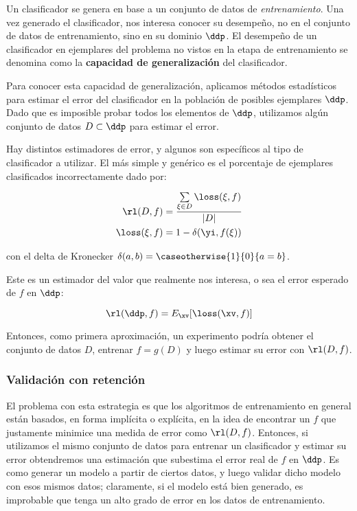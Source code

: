 
Un clasificador se genera en base a un conjunto de datos de \textit{entrenamiento}. Una vez generado el clasificador, nos interesa conocer su desempeño, no en el conjunto de datos de entrenamiento, sino en su dominio $\ddp$. El desempeño de un clasificador en ejemplares del problema no vistos en la etapa de entrenamiento se denomina como la \textbf{capacidad de generalización} del clasificador. 

Para conocer esta capacidad de generalización, aplicamos métodos estadísticos para estimar el error del clasificador en la población de posibles ejemplares $\ddp$. Dado que es imposible probar todos los elementos de $\ddp$, utilizamos algún conjunto de datos $D \subset \ddp$ para estimar el error.

Hay distintos estimadores de error, y algunos son específicos al tipo de clasificador a utilizar. El más simple y genérico es el porcentaje de ejemplares clasificados incorrectamente dado por:

\begin{align}
\rl(D,f) &= \frac{\sum\limits_{\xi \in D} \loss(\xi,f) }{|D|} \\
\loss(\xi	,f) &= 1-\delta(\yi,f(\xi))
\end{align}

con el delta de Kronecker $\delta(a,b)= \caseotherwise{1}{0}{a=b}$. 

Este es un estimador del valor que realmente nos interesa, o sea el error esperado de $f$ en $\ddp$:

\begin{equation}
  \rl(\ddp,f)= E_{\xv} [ \loss(\xv,f) ]
\end{equation}

Entonces, como primera aproximación, un experimento podría obtener el conjunto de datos $D$, entrenar $f=g(D)$ y luego estimar su error con $\rl(D,f)$. 

\subsubsection{Validación con retención}

El problema con esta estrategia es que los algoritmos de entrenamiento en general están basados, en forma implícita o explícita, en la idea de encontrar un $f$ que justamente minimice una medida de error como $\rl(D,f)$. Entonces, si utilizamos el mismo conjunto de datos para entrenar un clasificador y estimar su error obtendremos una estimación que subestima el error real de $f$ en $\ddp$. Es como generar un modelo a partir de ciertos datos, y luego validar dicho modelo con esos mismos datos; claramente, si el modelo está bien generado, es improbable que tenga un alto grado de error en los datos de entrenamiento.

